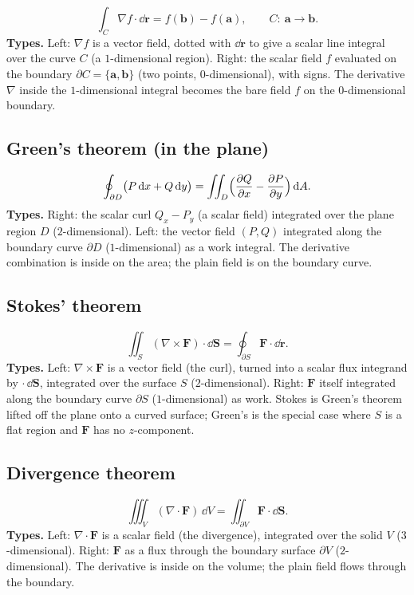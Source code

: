 \documentclass{essay}
\newcommand{\F}{\mathbf{F}}
\begin{document}
\[
  \int_C \nabla f\cdot\dd\mathbf{r} = f(\mathbf{b}) - f(\mathbf{a}),
  \qquad C:\ \mathbf{a}\to\mathbf{b}.
\]
\textbf{Types.} Left: $\nabla f$ is a vector field, dotted with $\dd\mathbf{r}$ to
give a scalar line integral over the curve $C$ (a $1$-dimensional region). Right: the
scalar field $f$ evaluated on the boundary $\partial C=\{\mathbf{a},\mathbf{b}\}$
(two points, $0$-dimensional), with signs. The derivative $\nabla$ inside the
$1$-dimensional integral becomes the bare field $f$ on the $0$-dimensional boundary.

\subsection{Green's theorem (in the plane)}

\[
  \oint_{\partial D} \bigl(P\,\mathrm{d} x + Q\,\mathrm{d} y\bigr)
  = \iint_D \Bigl(\frac{\partial Q}{\partial x} - \frac{\partial P}{\partial y}\Bigr)\,\mathrm{d} A .
\]
\textbf{Types.} Right: the scalar curl $Q_x-P_y$ (a scalar field) integrated over the
plane region $D$ ($2$-dimensional). Left: the vector field $(P,Q)$ integrated along
the boundary curve $\partial D$ ($1$-dimensional) as a work integral. The derivative
combination is inside on the area; the plain field is on the boundary curve.

\subsection{Stokes' theorem}

\[
  \iint_S (\nabla\times\F)\cdot\dd\mathbf{S}
  = \oint_{\partial S} \F\cdot\dd\mathbf{r}.
\]
\textbf{Types.} Left: $\nabla\times\F$ is a vector field (the curl), turned into a
scalar flux integrand by $\cdot\,\dd\mathbf{S}$, integrated over the surface $S$
($2$-dimensional). Right: $\F$ itself integrated along the boundary curve
$\partial S$ ($1$-dimensional) as work. Stokes is Green's theorem lifted off the
plane onto a curved surface; Green's is the special case where $S$ is a flat region
and $\F$ has no $z$-component.

\subsection{Divergence theorem}

\[
  \iiint_V (\nabla\cdot\F)\,\dd V
  = \iint_{\partial V} \F\cdot\dd\mathbf{S}.
\]
\textbf{Types.} Left: $\nabla\cdot\F$ is a scalar field (the divergence), integrated
over the solid $V$ ($3$-dimensional). Right: $\F$ as a flux through the boundary
surface $\partial V$ ($2$-dimensional). The derivative is inside on the volume; the
plain field flows through the boundary.
\end{document}
